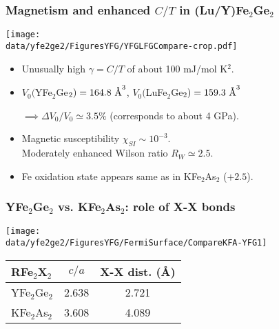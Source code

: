 \begin{frame}[label=YFGIntro2]
\frametitle{Magnetism and enhanced $C/T$ in  (Lu/Y)Fe$_2$Ge$_2$}
\centerline{\texttt{[image: \\data/yfe2ge2/FiguresYFG/YFGLFGCompare-crop.pdf]}}
\begin{itemize} \itemsep 8pt
\item
Unusually high $\gamma = C/T$ of about 100 mJ/mol K$^2$.
\item
$V_0 ($YFe$_2$Ge$_2) = 164.8 ~\mbox{\AA}^3$, $V_0 ($LuFe$_2$Ge$_2) =
159.3 ~\mbox{\AA}^3$ 

\hfill $\implies \Delta V_0/V_0 \simeq 3.5 \%$
(corresponds to about 4 GPa).

\item
Magnetic susceptibility $\chi_{SI} \sim 10^{-3}$. \\ Moderately enhanced Wilson ratio $R_W \simeq 2.5$.

\item
Fe oxidation state appears same as in KFe$_2$As$_2$ ($+2.5$).

\end{itemize}
\end{frame}



\begin{frame}[label=KFAYFGComparison1]
\frametitle{YFe$_2$Ge$_2$ vs. KFe$_2$As$_2$: role of X-X bonds}

\centerline{\texttt{[image: \\data/yfe2ge2/FiguresYFG/FermiSurface/CompareKFA-YFG1]}}


\begin{center}
\begin{tabular}{l|c|c}
RFe$_2$X$_2$ & $c/a$ & X-X dist. (\AA) \\
\hline
YFe$_2$Ge$_2$ & 2.638 & 2.721 \\
KFe$_2$As$_2$ & 3.608 & 4.089  \\
\hline
\end{tabular}
\end{center}


\end{frame}


